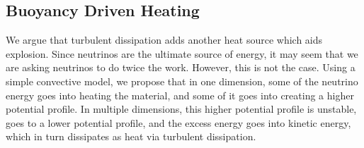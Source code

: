 \documentclass[twocolumn]{aastex6}
\begin{document}

\subsection{Buoyancy Driven Heating}


We argue that turbulent dissipation adds another heat source
  which aids explosion.  Since neutrinos are the ultimate source of
  energy, it may seem that we are asking neutrinos to do twice the
  work.  However, this is not the case. Using a simple convective
  model, we propose that in one dimension, some of the neutrino energy goes into
  heating the material, and some of it goes into creating a higher
  potential profile.  In multiple dimensions, this higher
    potential profile is unstable, goes to a lower potential profile,
    and the excess energy goes into kinetic energy, which in turn
    dissipates as heat via turbulent dissipation.
\end{document}
